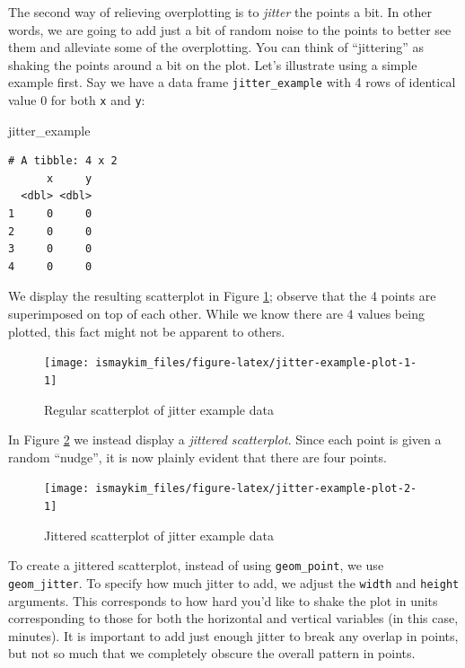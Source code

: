 \documentclass[12pt,]{krantz}
\makeatletter
\newenvironment{Shaded}{\begin{snugshade}}{\end{snugshade}}
\newcommand{\NormalTok}[1]{#1}
\newenvironment{kframe}{%
\medskip{}
\setlength{\fboxsep}{.8em}
 \def\at@end@of@kframe{}%
 \ifinner\ifhmode%
  \def\at@end@of@kframe{\end{minipage}}%
  \begin{minipage}{\columnwidth}%
 \fi\fi%
 \def\FrameCommand##1{\hskip\@totalleftmargin \hskip-\fboxsep
 \colorbox{shadecolor}{##1}\hskip-\fboxsep
     \hskip-\linewidth \hskip-\@totalleftmargin \hskip\columnwidth}%
 \MakeFramed {\advance\hsize-\width
   \@totalleftmargin\z@ \linewidth\hsize
   \@setminipage}}%
 {\par\unskip\endMakeFramed%
 \at@end@of@kframe}
\renewenvironment{Shaded}{\begin{kframe}}{\end{kframe}}
\makeatother
\begin{document}
The second way of relieving overplotting is to \emph{jitter} the points
a bit. In other words, we are going to add just a bit of random noise to
the points to better see them and alleviate some of the overplotting.
You can think of ``jittering'' as shaking the points around a bit on the
plot. Let's illustrate using a simple example first. Say we have a data
frame \texttt{jitter\_example} with 4 rows of identical value 0 for both
\texttt{x} and \texttt{y}:

\begin{Shaded}
\begin{Highlighting}[]
\NormalTok{jitter_example}
\end{Highlighting}
\end{Shaded}

\begin{verbatim}
# A tibble: 4 x 2
      x     y
  <dbl> <dbl>
1     0     0
2     0     0
3     0     0
4     0     0
\end{verbatim}

We display the resulting scatterplot in Figure
\ref{fig:jitter-example-plot-1}; observe that the 4 points are
superimposed on top of each other. While we know there are 4 values
being plotted, this fact might not be apparent to others.

\begin{figure}

{\centering \texttt{[image: ismaykim\_files/figure-latex/jitter-example-plot-1-1]} 

}

\caption{Regular scatterplot of jitter example data}\label{fig:jitter-example-plot-1}
\end{figure}

In Figure \ref{fig:jitter-example-plot-2} we instead display a
\emph{jittered scatterplot}. Since each point is given a random
``nudge'', it is now plainly evident that there are four points.

\begin{figure}

{\centering \texttt{[image: ismaykim\_files/figure-latex/jitter-example-plot-2-1]} 

}

\caption{Jittered scatterplot of jitter example data}\label{fig:jitter-example-plot-2}
\end{figure}

To create a jittered scatterplot, instead of using \texttt{geom\_point},
we use \texttt{geom\_jitter}. To specify how much jitter to add, we
adjust the \texttt{width} and \texttt{height} arguments. This
corresponds to how hard you'd like to shake the plot in units
corresponding to those for both the horizontal and vertical variables
(in this case, minutes). It is important to add just enough jitter to
break any overlap in points, but not so much that we completely obscure
the overall pattern in points.
\end{document}
